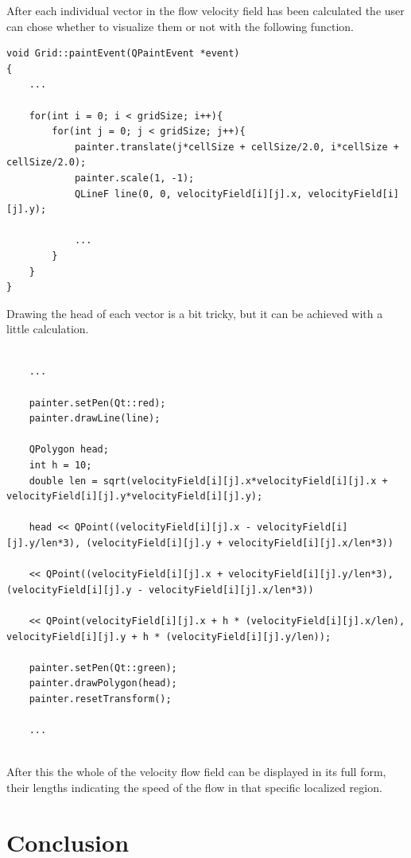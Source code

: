 \documentclass[12pt, titlepage]{article}
\begin{document}
After each individual vector in the flow velocity field has been calculated the user can chose whether to visualize them or not with the following function.

\begin{lstlisting}
void Grid::paintEvent(QPaintEvent *event)
{
    ...
    
    for(int i = 0; i < gridSize; i++){
        for(int j = 0; j < gridSize; j++){
            painter.translate(j*cellSize + cellSize/2.0, i*cellSize + cellSize/2.0);
            painter.scale(1, -1);
            QLineF line(0, 0, velocityField[i][j].x, velocityField[i][j].y);
            
            ...
        }
    }
}
\end{lstlisting}

Drawing the head of each vector is a bit tricky, but it can be achieved with a little calculation.

\begin{lstlisting}
	
	...
	
	painter.setPen(Qt::red);
    painter.drawLine(line);
            
	QPolygon head;
	int h = 10;
    double len = sqrt(velocityField[i][j].x*velocityField[i][j].x + velocityField[i][j].y*velocityField[i][j].y);
    
    head << QPoint((velocityField[i][j].x - velocityField[i][j].y/len*3), (velocityField[i][j].y + velocityField[i][j].x/len*3)) 
    
    << QPoint((velocityField[i][j].x + velocityField[i][j].y/len*3), (velocityField[i][j].y - velocityField[i][j].x/len*3))
    
    << QPoint(velocityField[i][j].x + h * (velocityField[i][j].x/len), velocityField[i][j].y + h * (velocityField[i][j].y/len));
    
    painter.setPen(Qt::green);
    painter.drawPolygon(head);
    painter.resetTransform();
    
    ...
    
\end{lstlisting}

After this the whole of the velocity flow field can be displayed in its full form, their lengths  indicating the speed of the flow in that specific localized region.

\pagebreak

\section{Conclusion}
\end{document}
